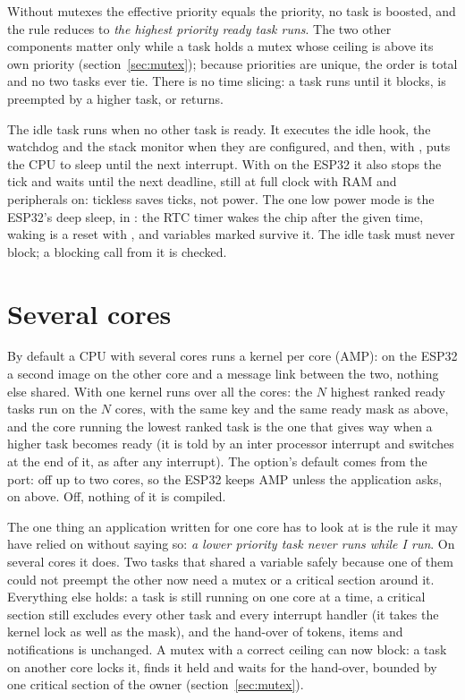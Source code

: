 Without mutexes the effective priority equals the priority, no task is boosted, and the
rule reduces to \emph{the highest priority ready task runs}. The two other components
matter only while a task holds a mutex whose ceiling is above its own priority
(section~\ref{sec:mutex}); because priorities are unique, the order is total and no two
tasks ever tie. There is no time slicing: a task runs until it blocks, is preempted by a
higher task, or returns.

The idle task runs when no other task is ready. It executes the idle hook, the watchdog
and the stack monitor when they are configured, and then, with
, puts the CPU to sleep until the next interrupt. With
 on the ESP32 it also stops the tick and waits until the next
deadline, still at full clock with RAM and peripherals on: tickless saves ticks, not
power. The one low power mode is the ESP32's deep sleep,  in
: the RTC timer wakes the chip after the given time, waking is a reset
with , and variables marked  survive
it. The idle task must never block; a blocking call from it is checked.

\section{Several cores}
\label{sec:smp}

By default a CPU with several cores runs a kernel per core (AMP): on the ESP32 a second
image on the other core and a message link between the two, nothing else shared. With
 one kernel runs over all the cores: the $N$ highest ranked ready
tasks run on the $N$ cores, with the same key and the same ready mask as above, and the
core running the lowest ranked task is the one that gives way when a higher task becomes
ready (it is told by an inter processor interrupt and switches at the end of it, as after
any interrupt). The option's default comes from the port: off up to two cores, so the
ESP32 keeps AMP unless the application asks, on above. Off, nothing of it is compiled.

The one thing an application written for one core has to look at is the rule it may have
relied on without saying so: \emph{a lower priority task never runs while I run}. On
several cores it does. Two tasks that shared a variable safely because one of them could
not preempt the other now need a mutex or a critical section around it. Everything else
holds: a task is still running on one core at a time, a critical section still excludes
every other task and every interrupt handler (it takes the kernel lock as well as the
mask), and the hand-over of tokens, items and notifications is unchanged. A mutex with a
correct ceiling can now block: a task on another core locks it, finds it held and waits
for the hand-over, bounded by one critical section of the owner
(section~\ref{sec:mutex}).

